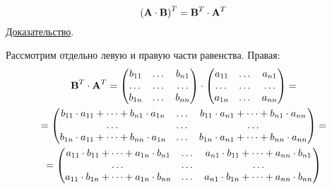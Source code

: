 \documentclass[../../calc-math-exam-2023.tex]{subfiles}
\begin{document}
    \begin{theorem}
        \begin{equation*}
            \left( \bf{A} \cdot \bf{B} \right)^T = \bf{B}^T \cdot \bf{A}^T
        \end{equation*}
        \underline{Доказательство}.
        \vspace{5pt}

        Рассмотрим отдельно левую и правую части равенства. Правая:
        \begin{gather*}
            \bf{B}^T \cdot \bf{A}^T =
            \begin{pmatrix}
                b_{11} & \dots & b_{n1} \\
                \dots  & \dots & \dots  \\
                b_{1n} & \dots & b_{nn}
            \end{pmatrix}
            \cdot
            \begin{pmatrix}
                a_{11} & \dots & a_{n1} \\
                \dots  & \dots & \dots  \\
                a_{1n} & \dots & a_{nn}
            \end{pmatrix} =\\
            =\begin{pmatrix}
                 b_{11} \cdot a_{11} + \dots + b_{n1} \cdot a_{1n} & \dots & b_{11} \cdot a_{n1} + \dots + b_{n1} \cdot a_{nn} \\
                 \dots                                             & \dots & \dots                                             \\
                 b_{1n} \cdot a_{11} + \dots + b_{nn} \cdot a_{1n} & \dots & b_{1n} \cdot a_{n1} + \dots + b_{nn} \cdot a_{nn}
            \end{pmatrix} = \\
            = \begin{pmatrix}
                  a_{11} \cdot b_{11} + \dots + a_{1n} \cdot b_{n1} & \dots & a_{n1} \cdot b_{11} + \dots + a_{nn} \cdot b_{n1} \\
                  \dots                                             & \dots & \dots                                             \\
                  a_{11} \cdot b_{1n} + \dots + a_{1n} \cdot b_{nn} & \dots & a_{n1} \cdot b_{1n} + \dots + a_{nn} \cdot b_{nn}
            \end{pmatrix}
        \end{gather*}

\end{theorem}
\end{document}
